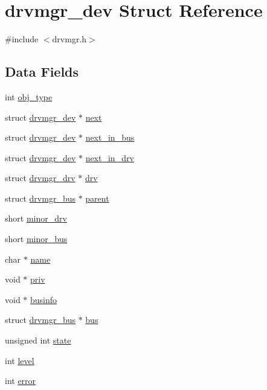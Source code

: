 \hypertarget{structdrvmgr__dev}{}\section{drvmgr\+\_\+dev Struct Reference}
\label{structdrvmgr__dev}


{\ttfamily \#include $<$drvmgr.\+h$>$}

\subsection*{Data Fields}
\begin{DoxyCompactItemize}
\item 
int \mbox{\hyperlink{structdrvmgr__dev_aa0f5e36183d83d612809d360fae88a5e}{obj\+\_\+type}}
\item 
struct \mbox{\hyperlink{structdrvmgr__dev}{drvmgr\+\_\+dev}} $\ast$ \mbox{\hyperlink{structdrvmgr__dev_a3a9293f08d07aff4edaec9cebd2f7daa}{next}}
\item 
struct \mbox{\hyperlink{structdrvmgr__dev}{drvmgr\+\_\+dev}} $\ast$ \mbox{\hyperlink{structdrvmgr__dev_a6dde549cda61d3c8ef3f0107328cf14b}{next\+\_\+in\+\_\+bus}}
\item 
struct \mbox{\hyperlink{structdrvmgr__dev}{drvmgr\+\_\+dev}} $\ast$ \mbox{\hyperlink{structdrvmgr__dev_a8d0b0a55a355d8d5c20b3eafe5f7a450}{next\+\_\+in\+\_\+drv}}
\item 
struct \mbox{\hyperlink{structdrvmgr__drv}{drvmgr\+\_\+drv}} $\ast$ \mbox{\hyperlink{structdrvmgr__dev_a73a4618b4456ddad5a5f31ebb830e657}{drv}}
\item 
struct \mbox{\hyperlink{structdrvmgr__bus}{drvmgr\+\_\+bus}} $\ast$ \mbox{\hyperlink{structdrvmgr__dev_a8f6d9336c942725b6ab463b3a95b75ea}{parent}}
\item 
short \mbox{\hyperlink{structdrvmgr__dev_ab3035ae0bfd6ea769c24bda5e5ca24a5}{minor\+\_\+drv}}
\item 
short \mbox{\hyperlink{structdrvmgr__dev_ad1e8865cac960cfe73cd69c181b6add3}{minor\+\_\+bus}}
\item 
char $\ast$ \mbox{\hyperlink{structdrvmgr__dev_a3ca456efcf196648d8c2eefc76f3ee21}{name}}
\item 
void $\ast$ \mbox{\hyperlink{structdrvmgr__dev_a7d51e50ee5b48b67b0793de368eb8751}{priv}}
\item 
void $\ast$ \mbox{\hyperlink{structdrvmgr__dev_acdae19c81d1111a8dc952501c9519254}{businfo}}
\item 
struct \mbox{\hyperlink{structdrvmgr__bus}{drvmgr\+\_\+bus}} $\ast$ \mbox{\hyperlink{structdrvmgr__dev_a07923db7c70d3287d70849ba1b16acb2}{bus}}
\item 
unsigned int \mbox{\hyperlink{structdrvmgr__dev_a6cf0b5c5f009ba47cf18fa567eb9218d}{state}}
\item 
int \mbox{\hyperlink{structdrvmgr__dev_a36ae5e46a2bd69b67288b8ca52cc37dd}{level}}
\item 
int \mbox{\hyperlink{structdrvmgr__dev_aa3e438d71e595a06f73d39b58cb78828}{error}}
\end{DoxyCompactItemize}


